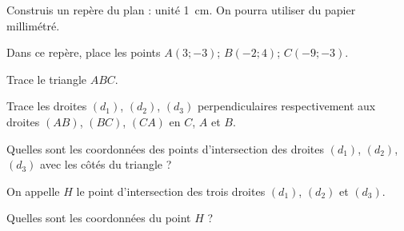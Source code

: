 \begin{myenumerate}
\item Construis un repère du plan : unité 1~cm. On pourra utiliser
du papier millimétré.
\item Dans ce repère, place les points $A(3;-3)$; $B(-2;4)$; $C(-9;-3)$.
\par Trace le triangle $ABC$.
\item Trace les droites $(d_1)$, $(d_2)$, $(d_3)$ perpendiculaires
 respectivement aux droites $(AB)$, $(BC)$, $(CA)$ en $C$, $A$ et $B$.
\par Quelles sont les coordonnées des points d'intersection des
droites $(d_1)$, $(d_2)$, $(d_3)$ avec les côtés du triangle ?
\item On appelle $H$ le point d'intersection des trois droites $(d_1)$,
$(d_2)$ et $(d_3)$.
\par Quelles sont les coordonnées du point $H$ ?
\end{myenumerate}

